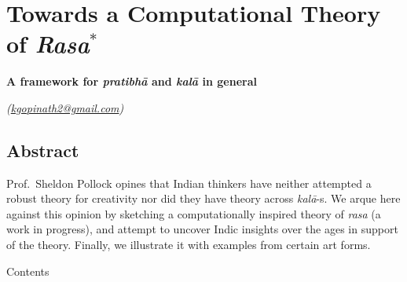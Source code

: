 \chapter[Towards a Computational Theory of \textsl{Rasa}]{Towards a Computational Theory of \textsl{Rasa}$^{*}$}\label{chapter\thechapter:begin}

\begin{center}
{\bf A framework for \textsl{pratibhā} and \textsl{kalā} in general}
\end{center}


\hfill{\sl(\url{kgopinath2@gmail.com})}


\section*{Abstract}

Prof.\ Sheldon Pollock opines that Indian thinkers have neither attempted a robust theory for creativity nor did they have theory across \hbox{\textsl{kalā}-s}. We arque here against this opinion by sketching a computationally inspired theory of \textsl{rasa} (a work in progress), and attempt to uncover Indic insights over the ages in support of the theory. Finally, we illustrate it with examples from certain art forms.

\bigskip
\noindent
{\large Contents}

